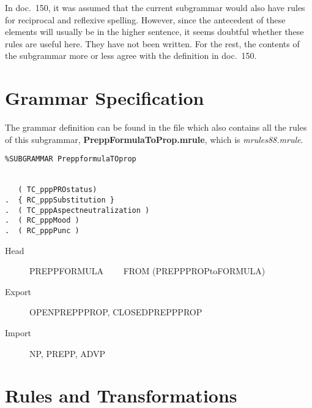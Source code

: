In doc.\ 150, it was assumed that the current subgrammar would also have rules 
for reciprocal and reflexive spelling. However, since the antecedent of these 
elements will usually be in the higher sentence, it seems doubtful whether 
these rules are useful here. They have not been written. For the rest, the 
contents of the subgrammar more or less agree with the definition in doc.\ 150.

\section{Grammar Specification}
The grammar definition can be found in the file which also contains all the 
rules of this subgrammar, {\bf PreppFormulaToProp.mrule}, 
which is {\em mrules88.mrule\/}.

\begin{verbatim}
%SUBGRAMMAR PreppformulaTOprop


   ( TC_pppPROstatus)
.  { RC_pppSubstitution }
.  ( TC_pppAspectneutralization )
.  ( RC_pppMood )
.  ( RC_pppPunc )

\end{verbatim}

\begin{description}
  \item[Head]  PREPPFORMULA  \ \ \ \ FROM (PREPPPROPtoFORMULA)
  \item[Export] OPENPREPPPROP, CLOSEDPREPPPROP
  \item[Import] NP, PREPP, ADVP
\end{description}

\newpage
\section{Rules and Transformations}

